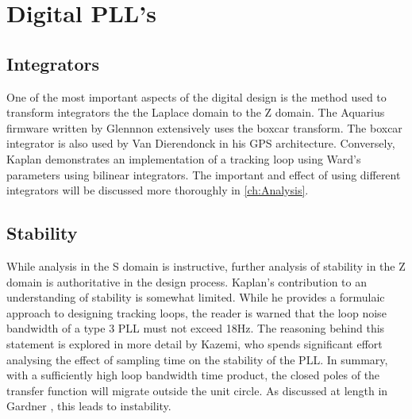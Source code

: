 \clearpage

\section{Digital PLL's}
	\subsection{Integrators}
	One of the most important aspects of the digital design is the method used to transform integrators the the Laplace domain to the Z domain. The Aquarius firmware\cite{FirmwareCode} written by Glennnon extensively uses the boxcar transform. The boxcar integrator is also used by Van Dierendonck  \cite{Spilker} in his GPS architecture. Conversely, Kaplan \cite{Kaplan} demonstrates an implementation of a tracking loop using Ward's parameters using bilinear integrators. The important and effect of using different integrators will be discussed more thoroughly in \ref{ch:Analysis}.
	
	\subsection{Stability}
	    While analysis in the S domain is instructive, further analysis of stability in the Z domain is authoritative in the design process. Kaplan's contribution to an understanding of stability is somewhat limited. While he provides a formulaic approach to designing tracking loops, the reader is warned that the loop noise bandwidth of a type 3 PLL must not exceed 18Hz\cite{Kaplan}. The reasoning behind this statement is explored in more detail by Kazemi, who spends significant effort analysing the effect of sampling time on the stability of the PLL. In summary, with a sufficiently high loop bandwidth time product, the closed poles of the transfer function will migrate outside the unit circle. As discussed at length in Gardner \cite{Gardner}, this leads to instability. 






	    